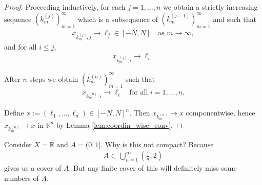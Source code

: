 \begin{proof}
	Proceeding inductively, for each $j=1,\dots,n$ we obtain a strictly increasing sequence $(k_m^{(j)})_{m=1}^{\infty}$ which is a subsequence of $(k_m^{(j-1)})_{m=1}^{\infty}$ and such that
	\begin{align*}
		x_{k_m^{(j)},j} \to \ell_j \in [-N,N] \quad \text{as } m \to \infty,
	\end{align*}
	and for all $i \le j$,
	\begin{align*}
		x_{k_m^{(j)},i} \to \ell_i.
	\end{align*}

	After $n$ steps we obtain $(k_m^{(n)})_{m=1}^{\infty}$ such that
	\begin{align*}
		x_{k_m^{(n)},i} \to \ell_i \quad \text{for all } i=1,\dots,n.
	\end{align*}

	Define $x := (\ell_1,\dots,\ell_n) \in [-N,N]^n$. Then $x_{k_m^{(n)}} \to x$ componentwise, hence $x_{k_m^{(n)}} \to x$ in $\mathbb{R}^n$ by Lemma \ref{lem:coordin_wise_conv}.
\end{proof}

\begin{eg}
	Consider $X = \mathbb{R}$ and $A = (0,1]$. Why is this not compact? Because
	\begin{align*}
		A \subset \bigcup_{n = 1}^{\infty} \left( \frac{1}{n}, 2 \right)
	\end{align*}
	gives us a cover of $A$. But any finite cover of this will definitely miss some numbers of $A$.
\end{eg}

